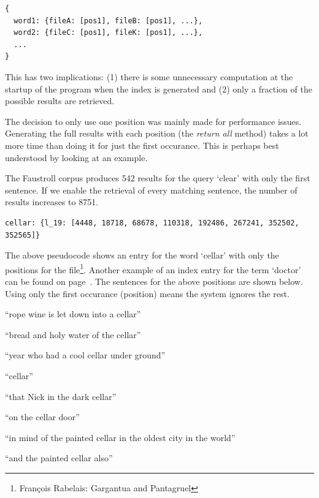\begin{verbatim}
{
  word1: {fileA: [pos1], fileB: [pos1], ...},
  word2: {fileC: [pos1], fileK: [pos1], ...},
  ...
}
\end{verbatim}

This has two implications: (1) there is some unnecessary computation at the startup of the program when the index is generated and (2) only a fraction of the possible results are retrieved.

The decision to only use one position was mainly made for performance issues. Generating the full results with each position (the \emph{return all} method) takes a lot more time than doing it for just the first occurance. This is perhaps best understood by looking at an example.

The Faustroll corpus produces \num{542} results for the query `clear' with only the first sentence. If we enable the retrieval of every matching sentence, the number of results increases to \num{8751}.

\begin{verbatim}
cellar: {l_19: [4448, 18718, 68678, 110318, 192486, 267241, 352502, 352565]}
\end{verbatim}

The above pseudocode shows an entry for the word `cellar' with only the positions for the  file\footnote{Fran\c{c}ois Rabelais: Gargantua and Pantagruel}. Another example of an index entry for the term `doctor' can be found on page~\pageref{c:pos}. The sentences for the above positions are shown below. Using only the first occurance (position) means the system ignores the rest.

\begin{description}[leftmargin=2.2cm]
  \item[4448] ``rope wine is let down into a cellar''
  \item[18718] ``bread and holy water of the cellar''
  \item[68678] ``year who had a cool cellar under ground''
  \item[110318] ``cellar''
  \item[192486] ``that Nick in the dark cellar''
  \item[267241] ``on the cellar door''
  \item[352502] ``in mind of the painted cellar in the oldest city in the world''
  \item[352565] ``and the painted cellar also''
\end{description}


